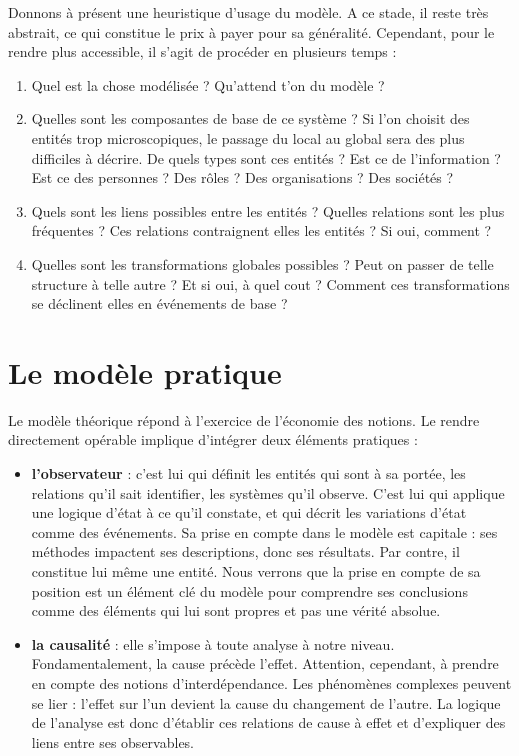 \documentclass[11pt]{article}
\begin{document}
	Donnons à présent une heuristique d'usage du modèle. A ce stade, il reste très abstrait, ce qui constitue le prix à payer pour sa généralité. Cependant, pour le rendre plus accessible, il s'agit de procéder en plusieurs temps : 
	\begin{enumerate}
		\item Quel est la chose modélisée ? Qu'attend t'on du modèle ? 
		\item Quelles sont les composantes de base de ce système ? Si l'on choisit des entités trop microscopiques, le passage du local au global sera des plus difficiles à décrire. De quels types sont ces entités ? Est ce de l'information ? Est ce des personnes ? Des rôles ? Des organisations ? Des sociétés ? 
		\item Quels sont les liens possibles entre les entités ? Quelles relations sont les plus fréquentes ? Ces relations contraignent elles les entités ? Si oui, comment ? 
		\item Quelles sont les transformations globales possibles ? Peut on passer de telle structure à telle autre ? Et si oui, à quel cout ? Comment ces transformations se déclinent elles en événements de base ? 
	\end{enumerate}
	
	\section{Le modèle pratique}
	
	Le modèle théorique répond à l'exercice de l'économie des notions. Le rendre directement opérable implique d'intégrer deux éléments pratiques : 
	\begin{itemize}
		\item \textbf{l'observateur} : c'est lui qui définit les entités qui sont à sa portée, les relations qu'il sait identifier, les systèmes qu'il observe. C'est lui qui applique une logique d'état à ce qu'il constate, et qui décrit les variations d'état comme des événements. Sa prise en compte dans le modèle est capitale : ses méthodes impactent ses descriptions, donc ses résultats. Par contre, il constitue lui même une entité. Nous verrons que la prise en compte de sa position est un élément clé du modèle pour comprendre ses conclusions comme des éléments qui lui sont propres et pas une vérité absolue. 
		\item \textbf{la causalité} : elle s'impose à toute analyse à notre niveau. Fondamentalement, la cause précède l'effet. Attention, cependant, à prendre en compte des notions d'interdépendance. Les phénomènes complexes peuvent se lier : l'effet sur l'un devient la cause du changement de l'autre. La logique de l'analyse est donc d'établir ces relations de cause à effet et d'expliquer des liens entre ses observables. 
	\end{itemize}
	
\end{document}
